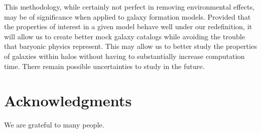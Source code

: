\documentclass[usenatbib,usegraphicx,letterpaper]{mn2e}
\begin{document}
This methodology, while certainly not perfect in removing environmental effects, may be of significance when applied to galaxy formation models. Provided that the properties of interest in a given model behave well under our redefinition, it will allow us to create better mock galaxy catalogs while avoiding the trouble that baryonic physics represent. This may allow us to better study the properties of galaxies within halos without having to substantially increase computation time. There remain possible uncertainties to study in the future. 

\section*{Acknowledgments}

We are grateful to many people.



\label{lastpage}
\end{document}
